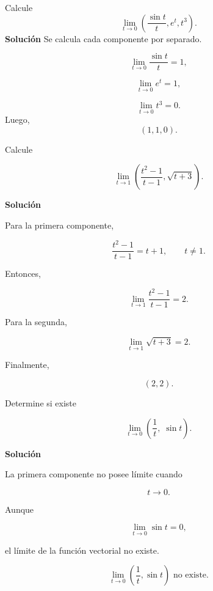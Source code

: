 \begin{ejemplo}[ ]
Calcule
\[
\lim_{t\to0}
\left(
\frac{\sin t}{t},
e^t,
t^3
\right).
\]
\textbf{Solución}
Se calcula cada componente por separado.

\[
\lim_{t\to0}\frac{\sin t}{t}=1,
\]

\[
\lim_{t\to0}e^t=1,
\]

\[
\lim_{t\to0}t^3=0.
\]
Luego,
\[
\boxed{
(1,1,0).
}
\]
\end{ejemplo}

\newpage

\begin{ejemplo}[ ]

Calcule

\[
\lim_{t\to1}
\left(
\frac{t^2-1}{t-1},
\sqrt{t+3}
\right).
\]

\textbf{Solución}

Para la primera componente,

\[
\frac{t^2-1}{t-1}
=
t+1,
\qquad t\neq1.
\]

Entonces,

\[
\lim_{t\to1}\frac{t^2-1}{t-1}=2.
\]

Para la segunda,

\[
\lim_{t\to1}\sqrt{t+3}=2.
\]

Finalmente,

\[
\boxed{(2,2).}
\]
\end{ejemplo}

\begin{ejemplo}[ ]

Determine si existe

\[
\lim_{t\to0}
\left(
\frac1t,\;
\sin t
\right).
\]

\textbf{Solución}

La primera componente no posee límite cuando

\[
t\rightarrow0.
\]

Aunque

\[
\lim_{t\to0}\sin t=0,
\]

el límite de la función vectorial no existe.

\[
\boxed{
\lim_{t\to0}
\left(
\frac1t,\sin t
\right)
\text{ no existe.}
}
\]
\end{ejemplo}



